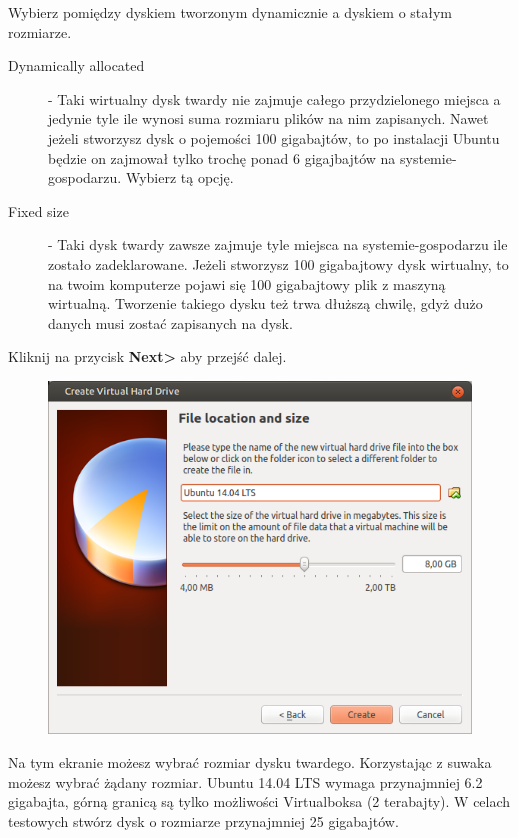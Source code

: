 Wybierz pomiędzy dyskiem tworzonym dynamicznie a dyskiem o stałym rozmiarze.
\begin{description}
\item[Dynamically allocated] - Taki wirtualny dysk twardy nie zajmuje całego przydzielonego miejsca a jedynie tyle ile wynosi suma rozmiaru plików na nim zapisanych. Nawet jeżeli stworzysz dysk o pojemości 100 gigabajtów, to po instalacji Ubuntu będzie on zajmował tylko trochę ponad 6 gigajbajtów na systemie-gospodarzu. Wybierz tą opcję.
\item[Fixed size] - Taki dysk twardy zawsze zajmuje tyle miejsca na systemie-gospodarzu ile zostało zadeklarowane. Jeżeli stworzysz 100 gigabajtowy dysk wirtualny, to na twoim komputerze pojawi się 100 gigabajtowy plik z maszyną wirtualną. Tworzenie takiego dysku też trwa dłuższą chwilę, gdyż dużo danych musi zostać zapisanych na dysk.
\end{description}
\begin{flushright}
Kliknij na przycisk \textbf{Next\textgreater} aby przejść dalej.
\end{flushright}
\onecolumn
\clearpage
\begin{figure}
		\includegraphics[width=\linewidth]{images/virtualbox_wizard6.png}
\end{figure}
Na tym ekranie możesz wybrać rozmiar dysku twardego. Korzystając z suwaka możesz wybrać żądany rozmiar. Ubuntu 14.04 LTS wymaga przynajmniej 6.2 gigabajta, górną granicą są tylko możliwości Virtualboksa (2 terabajty). W celach testowych stwórz dysk o rozmiarze przynajmniej 25 gigabajtów.


